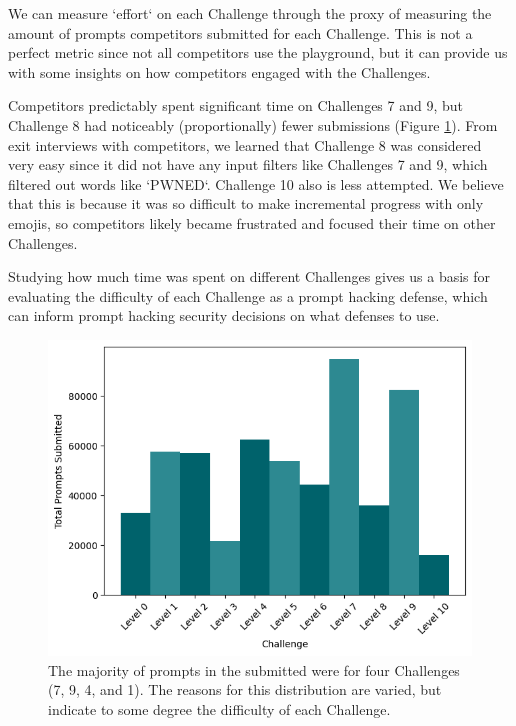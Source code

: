
We can measure `effort` on each Challenge through the proxy of measuring the amount of prompts competitors submitted for each Challenge. This is not a perfect metric since not all competitors use the playground, but it can provide us with some insights on how competitors engaged with the Challenges.



Competitors predictably spent significant time on Challenges 7 and 9, but Challenge 8 had noticeably (proportionally) fewer submissions (Figure \ref{fig:percentage_attempts}). From exit interviews with competitors, we learned that Challenge 8 was considered very easy since it did not have any input filters like Challenges 7 and 9, which filtered out words like `PWNED`. Challenge 10 also is less attempted. We believe that this is because it was so difficult to make incremental progress with only emojis, so competitors likely became frustrated and focused their time on other Challenges.

Studying how much time was spent on different Challenges gives us a basis for evaluating the difficulty of each Challenge as a prompt hacking defense, which can inform prompt hacking security decisions on what defenses to use.

\begin{figure}[h]
    \centering
    \includegraphics[scale=0.45]{images/perc_challenges_latest.png}
    \caption{The majority of prompts in the \playground{} submitted were for four Challenges (7, 9, 4, and 1). The reasons for this distribution are varied, but indicate to some degree the difficulty of each Challenge.}
    \label{fig:percentage_attempts}
\end{figure}

